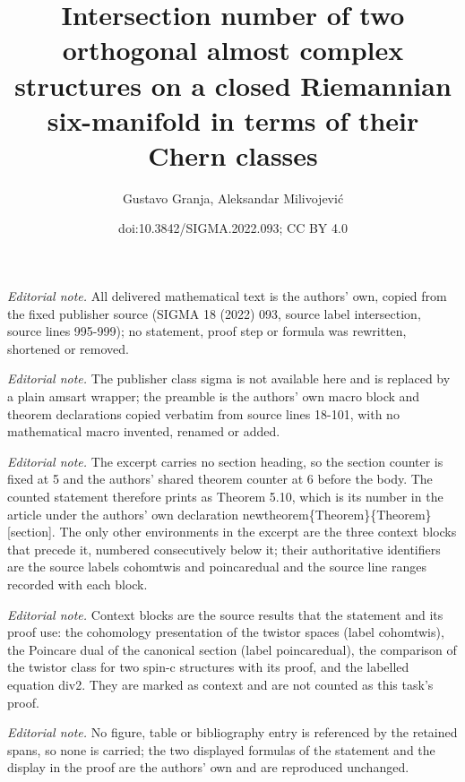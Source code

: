 \documentclass[10pt,a4paper]{amsart}
\title{Intersection number of two orthogonal almost complex structures on a closed Riemannian six-manifold in terms of their Chern classes}
\author{Gustavo Granja, Aleksandar Milivojević}
\date{doi:10.3842/SIGMA.2022.093; CC BY 4.0}
\numberwithin{equation}{section}
\begin{document}
\maketitle
\setcounter{section}{5}
\setcounter{Theorem}{6}
\noindent\textit{Editorial note.} All delivered mathematical text is the authors' own, copied from the fixed publisher source (SIGMA 18 (2022) 093, source label intersection, source lines 995-999); no statement, proof step or formula was rewritten, shortened or removed.\par\medskip
\noindent\textit{Editorial note.} The publisher class sigma is not available here and is replaced by a plain amsart wrapper; the preamble is the authors' own macro block and theorem declarations copied verbatim from source lines 18-101, with no mathematical macro invented, renamed or added.\par\medskip
\noindent\textit{Editorial note.} The excerpt carries no section heading, so the section counter is fixed at 5 and the authors' shared theorem counter at 6 before the body. The counted statement therefore prints as Theorem 5.10, which is its number in the article under the authors' own declaration newtheorem\{Theorem\}\{Theorem\}[section]. The only other environments in the excerpt are the three context blocks that precede it, numbered consecutively below it; their authoritative identifiers are the source labels cohomtwis and poincaredual and the source line ranges recorded with each block.\par\medskip
\noindent\textit{Editorial note.} Context blocks are the source results that the statement and its proof use: the cohomology presentation of the twistor spaces (label cohomtwis), the Poincare dual of the canonical section (label poincaredual), the comparison of the twistor class for two spin-c structures with its proof, and the labelled equation div2. They are marked as context and are not counted as this task's proof.\par\medskip
\noindent\textit{Editorial note.} No figure, table or bibliography entry is referenced by the retained spans, so none is carried; the two displayed formulas of the statement and the display in the proof are the authors' own and are reproduced unchanged.\par\medskip
\end{document}
